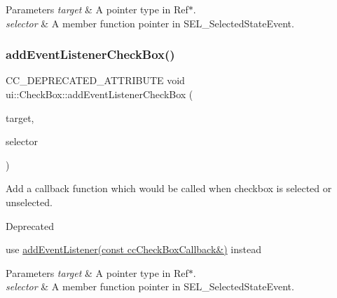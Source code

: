 \begin{DoxyParams}{Parameters}
{\em target} & A pointer type in Ref$\ast$. \\
\hline
{\em selector} & A member function pointer in S\+E\+L\+\_\+\+Selected\+State\+Event. \\
\hline
\end{DoxyParams}
\mbox{\label{classui_1_1CheckBox_aba61dc37dea57e11abaf381d685cdb16}} 
\subsubsection{\texorpdfstring{add\+Event\+Listener\+Check\+Box()}{addEventListenerCheckBox()}\hspace{0.1cm}{\footnotesize\ttfamily [2/2]}}
{\footnotesize\ttfamily C\+C\+\_\+\+D\+E\+P\+R\+E\+C\+A\+T\+E\+D\+\_\+\+A\+T\+T\+R\+I\+B\+U\+TE void ui\+::\+Check\+Box\+::add\+Event\+Listener\+Check\+Box (\begin{DoxyParamCaption}\item[{\hyperlink{classRef}{Ref} $\ast$}]{target,  }\item[{S\+E\+L\+\_\+\+Selected\+State\+Event}]{selector }\end{DoxyParamCaption})}

Add a callback function which would be called when checkbox is selected or unselected. \begin{DoxyRefDesc}{Deprecated}
\item[\hyperlink{deprecated__deprecated000374}{Deprecated}]use {\ttfamily \hyperlink{classui_1_1CheckBox_a11c1b9cd5d7314a980f994977f960822}{add\+Event\+Listener(const cc\+Check\+Box\+Callback\&)}} instead \end{DoxyRefDesc}

\begin{DoxyParams}{Parameters}
{\em target} & A pointer type in Ref$\ast$. \\
\hline
{\em selector} & A member function pointer in S\+E\+L\+\_\+\+Selected\+State\+Event. \\
\hline
\end{DoxyParams}
\mbox{\label{classui_1_1CheckBox_a51ac8199ab6468a0dbff60454193fe95}} 

